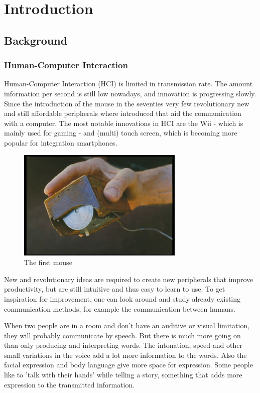 
\chapter{Introduction}
\label{ch:intro}

\section{Background}
\subsection*{Human-Computer Interaction}
Human-Computer Interaction (HCI) is limited in transmission rate. The amount information per second is still low nowadays, and innovation is progressing slowly. Since the introduction of the mouse in the seventies very few revolutionary new and still affordable peripherals where introduced that aid the communication with a computer. The most notable innovations in HCI are the Wii - which is mainly used for gaming - and (multi) touch screen, which is becoming more popular for integration smartphones.

\begin{figure}[htbp]
	\center{}
	\label{fig:mouse}
	\includegraphics[width=0.3\linewidth]{figures/mouse.jpg}
	\caption{The first mouse}
\end{figure}

New and revolutionary ideas are required to create new peripherals that improve productivity, but are still intuitive and thus easy to learn to use. To get inspiration for improvement, one can look around and study already existing communication methods, for example the communication between humans. 

When two people are in a room and don't have an auditive or visual limitation, they will probably communicate by speech. But there is much more going on than only producing and interpreting words. The intonation, speed and other small variations in the voice add a lot more information to the words. Also the facial expression and body language give more space for expression. Some people like to 'talk with their hands' while telling a story, something that adds more expression to the transmitted information.

